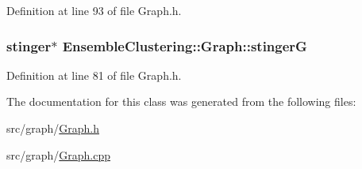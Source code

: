 Definition at line 93 of file Graph.\-h.

\hypertarget{class_ensemble_clustering_1_1_graph_af83709e85afb91c70729405a725afb9a}{
\subsubsection[{stinger\-G}]{\setlength{\rightskip}{0pt plus 5cm}stinger$\ast$ Ensemble\-Clustering\-::\-Graph\-::stinger\-G\hspace{0.3cm}{\ttfamily [protected]}}}\label{class_ensemble_clustering_1_1_graph_af83709e85afb91c70729405a725afb9a}


Definition at line 81 of file Graph.\-h.



The documentation for this class was generated from the following files\-:\begin{DoxyCompactItemize}
\item 
src/graph/\hyperlink{_graph_8h}{Graph.\-h}\item 
src/graph/\hyperlink{_graph_8cpp}{Graph.\-cpp}\end{DoxyCompactItemize}
